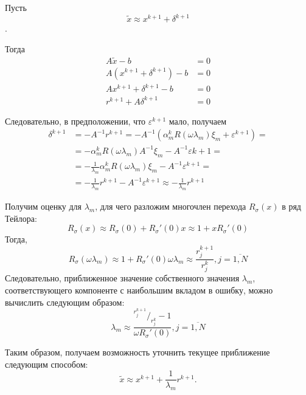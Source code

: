 \documentclass[a4paper,14pt]{extreport}
\begin{document}
Пусть $$\widetilde{x} \approx x^{k+1} + \delta^{k+1}$$.

Тогда 	
	\begin{equation}
	\label{komp:many_eq1}	
		\begin{aligned}
		A\widetilde{x} - b &= 0 \\
		A(x^{k+1} + \delta^{k+1}) - b &= 0 \\
		Ax^{k+1} + \delta^{k+1} - b &= 0 \\
		r^{k+1} + A\delta^{k+1} &= 0
		\end{aligned}
	\end{equation}

Следовательно, в предположении, что $\varepsilon^{k+1}$ мало, получаем
	\begin{equation}
	\label{komp:many_eq2}	
		\begin{aligned}
		\delta^{k+1} &= -A^{-1}r^{k+1} = -A^{-1}(\alpha_m^kR(\omega\lambda_m)\xi_m + \varepsilon^{k+1}) = \\ &= -\alpha_m^k R(\omega \lambda_m)A^{-1}\xi_m -A^{-1}\varepsilon{k+1} = \\ &= -\frac{1}{\lambda_m} \alpha_m^kR(\omega \lambda_m)\xi_m - A^{-1}\varepsilon^{k+1} = \\ &= -\frac{1}{\lambda_m} r^{k+1} - A^{-1}\varepsilon^{k+1} \approx -\frac{1}{\lambda_m}r^{k+1}
		\end{aligned}
	\end{equation}

Получим оценку для $\lambda_m$, для чего разложим многочлен перехода $R_\sigma(x)$ в ряд Тейлора:
	\begin{equation}
	\label{komp:taylor1}	
	R_\sigma(x) \approx R_\sigma(0) + R_\sigma'(0)x \approx 1 + xR_\sigma'(0)
	\end{equation}
Тогда,
	\begin{equation}
	\label{komp:taylor2}	
	R_\sigma(\omega\lambda_m) \approx 1 + R_\sigma'(0)\omega\lambda_m \approx \frac{r_j^{k+1}}{r_j^k}, j=\overbar{1, N}
	\end{equation}
Следовательно, приближенное значение собственного значения $\lambda_m$, соответствующего компоненте с наибольшим вкладом в ошибку, можно вычислить следующим образом:
\begin{equation}
	\label{komp:lambda}	
	\lambda_m \approx \frac{ {}^{r_j^{k+1}}/_{r_j^k} - 1}{\omega R_\sigma'(0)}, j=\overbar{1, N}
	\end{equation}
	
Таким образом, получаем возможность уточнить текущее приближение следующим способом:
	\begin{equation}	
	\label{komp:opressioneq}	
	\widetilde{x} \approx x^{k+1} + \dfrac{1}{\lambda_m}r^{k+1}.
	\end{equation}
\end{document}
